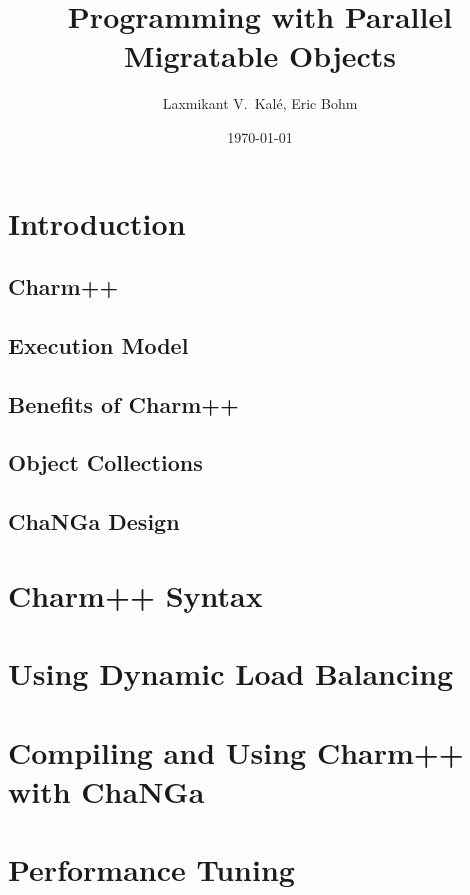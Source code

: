 \documentclass{beamer}
\title[Parallel Migratable Objects]{Programming with Parallel Migratable Objects}
\institute[UIUC]{Parallel Programming Laboratory \\University of Illinois Urbana-Champaign}
\author{Laxmikant V.~Kal\'e, Eric Bohm}
\date{\today}
\begin{document}
\frame{\titlepage}

\section[Concepts]{Introduction}
%
\subsection[Charm++]{Charm++}

\subsection[Execution Mode]{Execution Model}

\subsection[Benefits]{Benefits of Charm++}

\subsection[Collections]{Object Collections}

\subsection[ChaNGa Design]{ChaNGa Design}

\section[Charm++]{Charm++ Syntax}
\section[LB]{Using Dynamic Load Balancing}

\section[ChaNGa]{Compiling and Using Charm++ with ChaNGa}

\section[Tuning]{Performance Tuning}


\end{document}
